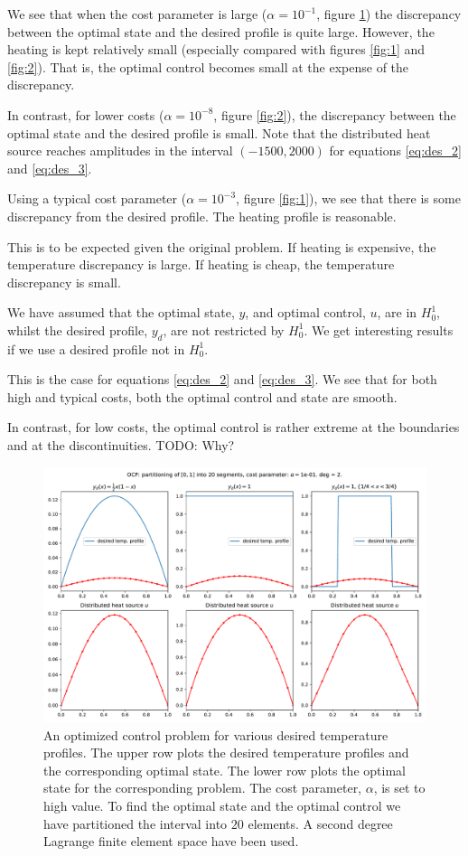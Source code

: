 We see that when the cost parameter is large (\( \alpha = 10^{-1} \), figure \ref{fig:0})
the discrepancy between the optimal state and the
desired profile is quite large.
However, the heating is kept relatively small
(especially compared with figures \ref{fig:1} and \ref{fig:2}).
That is, the optimal control becomes small at the
expense of the discrepancy.

In contrast, for lower costs (\( \alpha = 10^{-8} \),
figure \ref{fig:2}), the discrepancy between the optimal state
and the desired profile is small. 
Note that the distributed heat source reaches amplitudes in
the interval \( (-1500,2000) \) for equations \eqref{eq:des_2} and \eqref{eq:des_3}.

Using a typical cost parameter (\( \alpha = 10^{-3} \), figure \ref{fig:1}),
we see that there is some discrepancy from the
desired profile. The heating profile is reasonable.

This is to be expected given the original problem.
If heating is expensive, the temperature discrepancy is large.
If heating is cheap, the temperature discrepancy is small.

We have assumed that the optimal state, \( y \), and optimal control, \( u \),
are in $H_0^1$, whilst the desired profile, \( y_d \),
are not restricted by \( H_0^1 \).
We get interesting results if we use a desired profile not in $H_0^1$.

This is the case for equations \eqref{eq:des_2} and \eqref{eq:des_3}.
We see that for both high and typical costs,
both the optimal control and state are smooth.

In contrast, for low costs, the optimal control
is rather extreme at the boundaries and at
the discontinuities. TODO: Why?

\begin{figure}
  \centering
  \includegraphics[width=\textwidth]{Images/plots/task2_fig_0.pdf}
  \caption{An optimized control problem for various
    desired temperature profiles. The upper row plots the
    desired temperature profiles and the corresponding 
    optimal state. The lower row plots the
    optimal state for the corresponding problem.
    The cost parameter, $\alpha$, is set to high value.
    To find the optimal state and the optimal control we 
    have partitioned the interval into \( 20 \) elements.
    A second degree Lagrange finite element space have been used.}
  \label{fig:0}
\end{figure}

